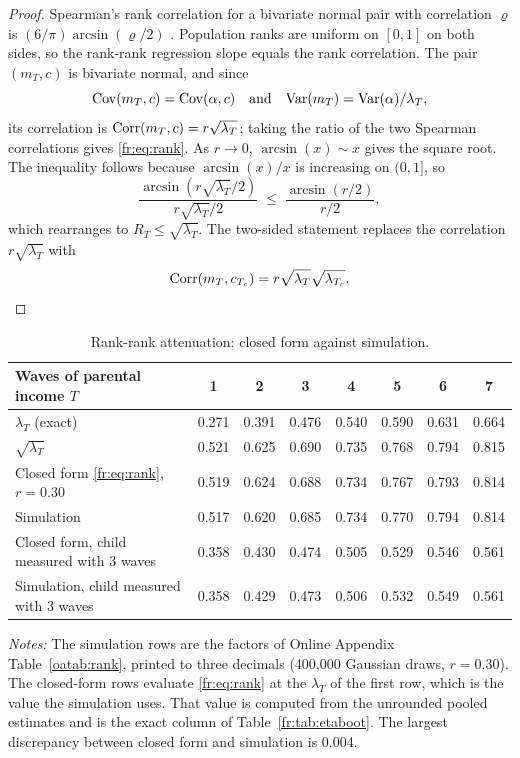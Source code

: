 \begin{proof}\sloppy
Spearman's rank correlation for a bivariate normal pair with correlation
$\varrho$ is $(6/\pi)\arcsin(\varrho/2)$ \citep{Pearson1907, Kruskal1958}.
Population ranks are uniform on $[0,1]$ on both sides, so the rank-rank
regression slope equals the rank correlation. The pair $(m_T, c)$ is
bivariate normal, and since
\[
\mathrm{Cov}(m_T, c) = \mathrm{Cov}(\alpha, c) \quad\text{and}\quad \mathrm{Var}(m_T) = \mathrm{Var}(\alpha)/\lambda_T,
\]
its correlation is $\mathrm{Corr}(m_T, c) = r\sqrt{\lambda_T}$; taking the ratio of
the two Spearman correlations gives \eqref{fr:eq:rank}. As $r \to 0$,
$\arcsin(x) \sim x$ gives the square root. The inequality follows because
$\arcsin(x)/x$ is increasing on $(0,1]$, so
\[
\frac{\arcsin(r\sqrt{\lambda_T}/2)}{r\sqrt{\lambda_T}/2} \;\le\; \frac{\arcsin(r/2)}{r/2},
\]
which rearranges to $R_T \le \sqrt{\lambda_T}$. The two-sided statement replaces
the correlation $r\sqrt{\lambda_T}$ with
\[
\mathrm{Corr}(m_T, c_{T_c}) = r\sqrt{\lambda_T}\sqrt{\lambda_{T_c}}.
\]
\end{proof}

\begin{table}[!htb]
\centering
\small
\caption{Rank-rank attenuation: closed form against simulation.}
\label{fr:tab:rank}
\begin{tabular}{@{}lccccccc@{}}
\toprule
Waves of parental income $T$ & 1 & 2 & 3 & 4 & 5 & 6 & 7 \\
\midrule
$\lambda_T$ (exact) & 0.271 & 0.391 & 0.476 & 0.540 & 0.590 & 0.631 & 0.664 \\
$\sqrt{\lambda_T}$ & 0.521 & 0.625 & 0.690 & 0.735 & 0.768 & 0.794 & 0.815 \\
Closed form \eqref{fr:eq:rank}, $r = 0.30$ & 0.519 & 0.624 & 0.688 & 0.734 & 0.767 & 0.793 & 0.814 \\
Simulation & 0.517 & 0.620 & 0.685 & 0.734 & 0.770 & 0.794 & 0.814 \\
\midrule
Closed form, child measured with 3 waves & 0.358 & 0.430 & 0.474 & 0.505 & 0.529 & 0.546 & 0.561 \\
Simulation, child measured with 3 waves & 0.358 & 0.429 & 0.473 & 0.506 & 0.532 & 0.549 & 0.561 \\
\bottomrule
\end{tabular}
\par\smallskip
\begin{minipage}{0.95\textwidth}
\footnotesize\emph{Notes:} The simulation rows are the factors of Online
Appendix Table~\ref{oatab:rank}, printed to three decimals (400,000
Gaussian draws, $r = 0.30$). The
closed-form rows evaluate \eqref{fr:eq:rank} at the $\lambda_T$ of the first
row, which is the value the simulation uses. That value is computed from the unrounded pooled estimates and is the exact column of Table~\ref{fr:tab:etaboot}. The largest discrepancy between closed form and simulation is
0.004.
\end{minipage}
\end{table}

